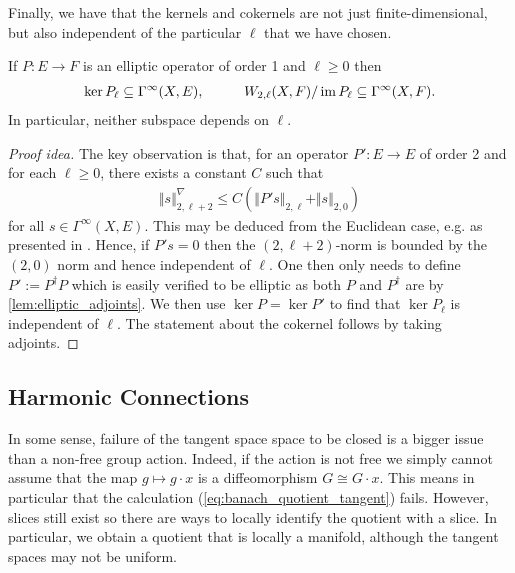 \documentclass[12pt]{ociamthesis}  %
\begin{document}
Finally, we have that the kernels and cokernels are not just
finite-dimensional, but also independent of the particular $\ell$
that we have chosen.

\begin{theorem}\label{eq:independence_of_l}
  If $P:E\to F$ is an elliptic operator of order 1
  and $\ell\geq 0$ then
  \begin{align*}
    \ker P_\ell \subseteq \Gamma^\infty(X,E),\hspace{1cm}
    W_{2,\ell}(X,F)/\operatorname{im} P_\ell \subseteq \Gamma^\infty(X,F).
  \end{align*}
  In particular, neither subspace depends on $\ell$.
  \begin{proof}[Proof idea]
    The key observation is that, for an operator
    $P':E\to E$ of order 2 and for each $\ell\geq 0$,
    there exists a constant $C$ such that
    \begin{align*}
      \Vert s\Vert^\nabla_{2,\ell+2} \leq C(\Vert P's\Vert_{2,\ell} + \Vert s\Vert_{2,0})
    \end{align*}
    for all $s\in\Gamma^\infty(X,E)$.
    This may be deduced from the Euclidean case, e.g. as presented in
    \cite[6.3.1 Theorem 2]{evans1998}. Hence, if $P's = 0$ then the
    $(2,\ell+2)$-norm is bounded
    by the $(2,0)$ norm and hence independent of $\ell$.
    One then only needs to define $P' := P^\dagger P$ which is easily
    verified to be elliptic as both $P$ and $P^\dagger$ are by
    \ref{lem:elliptic_adjoints}. We then use $\ker P = \ker P'$
    to find that $\ker P_\ell$ is independent of $\ell$. The
    statement about the cokernel follows by taking adjoints.
  \end{proof}
\end{theorem}

\subsection{Harmonic Connections}

In some sense, failure of the tangent space space to be closed is a bigger issue than
a non-free group action. Indeed, if the action is not free we simply cannot assume that
the map $g\mapsto g\cdot x$ is a diffeomorphism $G\cong G\cdot x$. This means in particular
that the calculation
(\ref{eq:banach_quotient_tangent}) fails. However, slices still exist so there are ways to
locally identify the quotient with a slice. In particular, we obtain a quotient that is
locally a manifold, although the tangent spaces may not be uniform.
\end{document}
